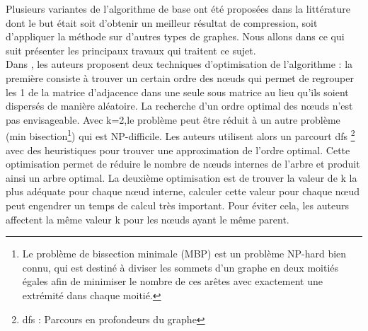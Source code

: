 Plusieurs variantes de l'algorithme de base ont été proposées dans la littérature dont le but était soit d'obtenir un meilleur résultat de compression, soit d'appliquer la méthode sur d'autres types de graphes. Nous allons dans ce qui suit présenter les principaux travaux qui traitent ce sujet.\\

Dans \citep{shi2012optimizing}, les auteurs proposent deux techniques d'optimisation de l'algorithme : la première consiste à trouver un certain ordre des nœuds qui permet de regrouper les 1 de la matrice d'adjacence dans une seule sous matrice au lieu qu'ils soient dispersés de manière aléatoire. La recherche d'un ordre optimal des nœuds n'est pas envisageable. Avec k=2,le problème peut être réduit à un autre problème (min bisection\footnote{Le problème de bissection minimale (MBP) est un problème NP-hard bien connu, qui est destiné à diviser les sommets d'un graphe en deux moitiés égales afin de minimiser le nombre de ces arêtes avec exactement une extrémité dans chaque moitié.}) qui est NP-difficile. Les auteurs utilisent alors un parcourt \gls{dfs}
\footnote{\gls{dfs} : Parcours en profondeurs du graphe}
 avec des heuristiques pour trouver une approximation de l'ordre optimal. Cette optimisation permet de réduire le nombre de nœuds internes de l'arbre et produit ainsi un arbre optimal. La deuxième optimisation est de trouver la valeur de k la plus adéquate pour chaque nœud interne, calculer cette valeur pour chaque nœud peut engendrer un temps de calcul très important. Pour éviter cela, les auteurs affectent la même valeur k pour les nœuds ayant le même parent. 	

